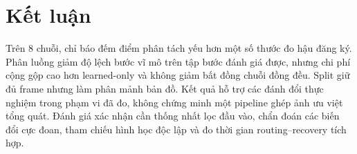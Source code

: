 \documentclass[conference]{IEEEtran}
\begin{document}
\section{Kết luận}
\label{sec:conclusion}

Trên 8 chuỗi, chỉ báo đếm điểm phân tách yếu hơn một số thước đo hậu đăng ký. Phân luồng giảm độ lệch bước vĩ mô trên tập bước đánh giá được, nhưng chi phí cộng gộp cao hơn learned-only và không giảm bất đồng chuỗi đồng đều. Split giữ đủ frame nhưng làm phân mảnh bản đồ. Kết quả hỗ trợ các đánh đổi thực nghiệm trong phạm vi đã đo, không chứng minh một pipeline ghép ảnh ưu việt tổng quát. Đánh giá xác nhận cần thống nhất lọc đầu vào, chẩn đoán các biến đổi cực đoan, tham chiếu hình học độc lập và đo thời gian routing--recovery tích hợp.



\end{document}
